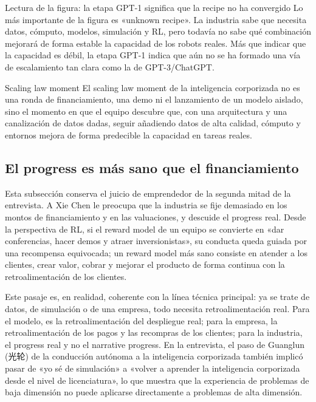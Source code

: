 \begin{knowledgebox}{Lectura de la figura: la etapa GPT-1 significa que la recipe no ha convergido}
Lo más importante de la figura es «unknown recipe». La industria sabe que necesita datos, cómputo, modelos, simulación y RL, pero todavía no sabe qué combinación mejorará de forma estable la capacidad de los robots reales. Más que indicar que la capacidad es débil, la etapa GPT-1 indica que aún no se ha formado una vía de escalamiento tan clara como la de GPT-3/ChatGPT.
\end{knowledgebox}

\begin{importantbox}{Scaling law moment}
El scaling law moment de la inteligencia corporizada no es una ronda de financiamiento, una demo ni el lanzamiento de un modelo aislado, sino el momento en que el equipo descubre que, con una arquitectura y una canalización de datos dadas, seguir añadiendo datos de alta calidad, cómputo y entornos mejora de forma predecible la capacidad en tareas reales.
\end{importantbox}

\subsection{El progress es más sano que el financiamiento}

Esta subsección conserva el juicio de emprendedor de la segunda mitad de la entrevista. A Xie Chen le preocupa que la industria se fije demasiado en los montos de financiamiento y en las valuaciones, y descuide el progress real. Desde la perspectiva de RL, si el reward model de un equipo se convierte en «dar conferencias, hacer demos y atraer inversionistas», su conducta queda guiada por una recompensa equivocada; un reward model más sano consiste en atender a los clientes, crear valor, cobrar y mejorar el producto de forma continua con la retroalimentación de los clientes.

Este pasaje es, en realidad, coherente con la línea técnica principal: ya se trate de datos, de simulación o de una empresa, todo necesita retroalimentación real. Para el modelo, es la retroalimentación del despliegue real; para la empresa, la retroalimentación de los pagos y las recompras de los clientes; para la industria, el progress real y no el narrative progress. En la entrevista, el paso de Guanglun (光轮) de la conducción autónoma a la inteligencia corporizada también implicó pasar de «yo sé de simulación» a «volver a aprender la inteligencia corporizada desde el nivel de licenciatura», lo que muestra que la experiencia de problemas de baja dimensión no puede aplicarse directamente a problemas de alta dimensión.

